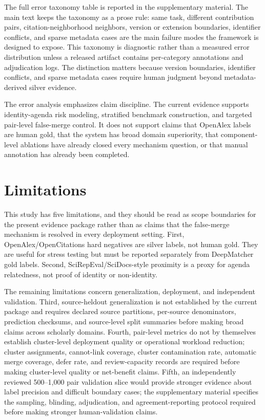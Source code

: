 \documentclass[preprint,12pt]{elsarticle}
\begin{document}
The full error taxonomy table is reported in the supplementary material. The main text keeps the taxonomy as a prose rule: same task, different contribution pairs, citation-neighborhood neighbors, version or extension boundaries, identifier conflicts, and sparse metadata cases are the main failure modes the framework is designed to expose. This taxonomy is diagnostic rather than a measured error distribution unless a released artifact contains per-category annotations and adjudication logs. The distinction matters because version boundaries, identifier conflicts, and sparse metadata cases require human judgment beyond metadata-derived silver evidence.

The error analysis emphasizes claim discipline. The current evidence supports identity-agenda risk modeling, stratified benchmark construction, and targeted pair-level false-merge control. It does not support claims that OpenAlex labels are human gold, that the system has broad domain superiority, that component-level ablations have already closed every mechanism question, or that manual annotation has already been completed.

\section{Limitations}

This study has five limitations, and they should be read as scope boundaries for the present evidence package rather than as claims that the false-merge mechanism is resolved in every deployment setting. First, OpenAlex/OpenCitations hard negatives are silver labels, not human gold. They are useful for stress testing but must be reported separately from DeepMatcher gold labels. Second, SciRepEval/SciDocs-style proximity is a proxy for agenda relatedness, not proof of identity or non-identity.

The remaining limitations concern generalization, deployment, and independent validation. Third, source-heldout generalization is not established by the current package and requires declared source partitions, per-source denominators, prediction checksums, and source-level split summaries before making broad claims across scholarly domains. Fourth, pair-level metrics do not by themselves establish cluster-level deployment quality or operational workload reduction; cluster assignments, cannot-link coverage, cluster contamination rate, automatic merge coverage, defer rate, and review-capacity records are required before making cluster-level quality or net-benefit claims. Fifth, an independently reviewed 500--1,000 pair validation slice would provide stronger evidence about label precision and difficult boundary cases; the supplementary material specifies the sampling, blinding, adjudication, and agreement-reporting protocol required before making stronger human-validation claims.
\end{document}
